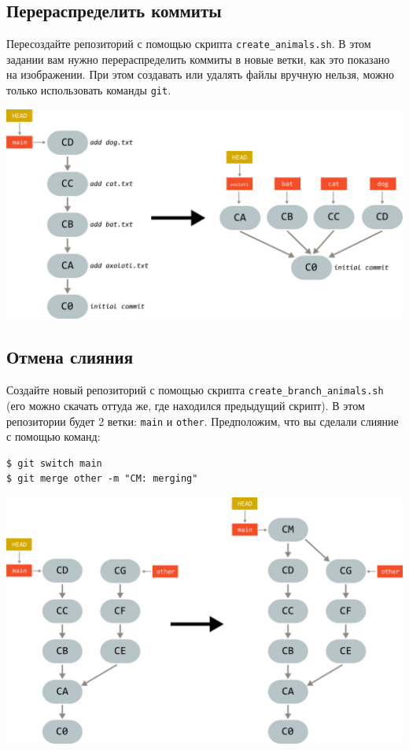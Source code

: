 \documentclass{article}
\begin{document}
\subsection{Перераспределить коммиты}
Пересоздайте репозиторий с помощью скрипта \texttt{create\_animals.sh}. В этом задании вам нужно перераспределить коммиты в новые ветки, как это показано на изображении. При этом создавать или удалять файлы вручную нельзя, можно только использовать команды \texttt{git}.
\begin{center}
\includegraphics[scale=0.8]{../images/rearrange_animals.png}
\end{center}


\subsection{Отмена слияния}
Создайте новый репозиторий с помощью скрипта \texttt{create\_branch\_animals.sh} (его можно скачать оттуда же, где находился предыдущий скрипт). В этом репозитории будет 2 ветки: \texttt{main} и \texttt{other}. Предположим, что вы сделали слияние с помощью команд:
\begin{lstlisting}[style=csMiptBash]
$ git switch main
$ git merge other -m "CM: merging"
\end{lstlisting}

\begin{center}
\includegraphics[scale=0.8]{../images/branch_animals_merge.png}
\end{center}
\end{document}
